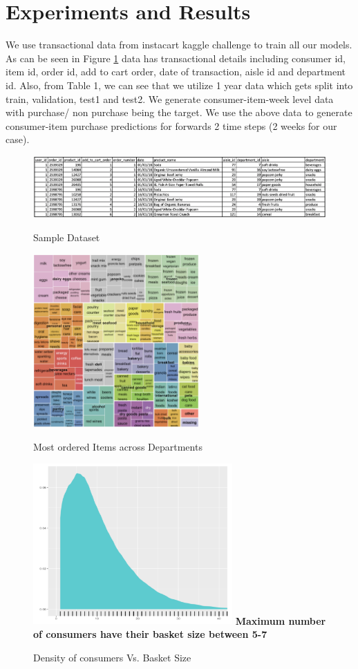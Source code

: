 \section{Experiments and Results}
We use transactional data from instacart kaggle challenge to train all our models. As can 
be seen in Figure \ref{fig:sampledata} data has transactional details including consumer id, item id, 
order id, add to cart order, date of transaction, aisle id and department id.
Also, from Table 1, we can see that we utilize 1 year data which gets split into train, validation,
test1 and test2. We generate consumer-item-week level data with purchase/ non purchase being the target.
We use the above data to generate consumer-item purchase predictions for forwards 2 time steps (2 weeks for our case).
 \begin{figure}[!t]
    \centering 
    \caption{Sample Dataset} 
    \includegraphics[width=6.6in]{img/sampledata.png} 
    \label{fig:sampledata} 
  \end{figure}

  \begin{figure}[t]
    \centering 
    \caption{Most ordered Items across Departments} 
    \includegraphics[width=2.5in]{img/items.png} 
    \label{fig:items} 
  \end{figure}

  \begin{figure}[t]
    \centering 
    \caption{Density of consumers Vs. Basket Size} 
    \includegraphics[width=3in]{img/basket.png} 
    {\bf Maximum number of consumers have their basket size between 5-7}
    \label{fig:basket} 
  \end{figure}

